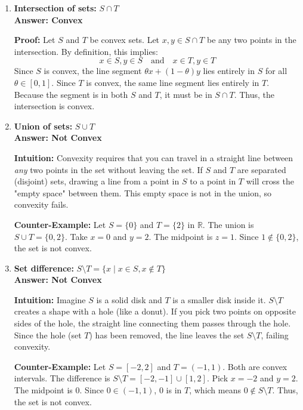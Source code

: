 \documentclass[12pt]{article}
\begin{document}
\begin{enumerate}
    \item[(a)] \textbf{Intersection of sets:} $S \cap T$ \\
    \textbf{Answer: Convex}
    
    \textbf{Proof:}
    Let $S$ and $T$ be convex sets. Let $x, y \in S \cap T$ be any two points in the intersection.
    By definition, this implies:
    $$ x \in S, y \in S \quad \text{and} \quad x \in T, y \in T $$
    Since $S$ is convex, the line segment $\theta x + (1-\theta)y$ lies entirely in $S$ for all $\theta \in [0,1]$.
    Since $T$ is convex, the same line segment lies entirely in $T$.
    Because the segment is in both $S$ and $T$, it must be in $S \cap T$. Thus, the intersection is convex.

    \item[(b)] \textbf{Union of sets:} $S \cup T$ \\
    \textbf{Answer: Not Convex}
    
    \textbf{Intuition:} 
    Convexity requires that you can travel in a straight line between \textit{any} two points in the set without leaving the set. If $S$ and $T$ are separated (disjoint) sets, drawing a line from a point in $S$ to a point in $T$ will cross the "empty space" between them. This empty space is not in the union, so convexity fails.
    
    \textbf{Counter-Example:}
    Let $S = \{0\}$ and $T = \{2\}$ in $\mathbb{R}$.
    The union is $S \cup T = \{0, 2\}$.
    Take $x=0$ and $y=2$. The midpoint is $z=1$.
    Since $1 \notin \{0, 2\}$, the set is not convex.

    \item[(c)] \textbf{Set difference:} $S \setminus T = \{x \mid x \in S, x \notin T\}$ \\
    \textbf{Answer: Not Convex}
    
    \textbf{Intuition:} 
    Imagine $S$ is a solid disk and $T$ is a smaller disk inside it. $S \setminus T$ creates a shape with a hole (like a donut). If you pick two points on opposite sides of the hole, the straight line connecting them passes through the hole. Since the hole (set $T$) has been removed, the line leaves the set $S \setminus T$, failing convexity.
    
    \textbf{Counter-Example:}
    Let $S = [-2, 2]$ and $T = (-1, 1)$. Both are convex intervals.
    The difference is $S \setminus T = [-2, -1] \cup [1, 2]$.
    Pick $x = -2$ and $y = 2$.
    The midpoint is $0$.
    Since $0 \in (-1, 1)$, $0$ is in $T$, which means $0 \notin S \setminus T$. Thus, the set is not convex.
\end{enumerate}
\end{document}
